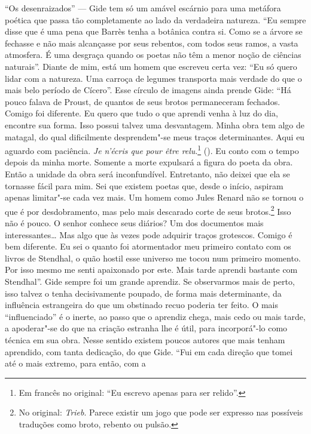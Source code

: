 ``Os desenraizados'' --- Gide tem só um amável escárnio para uma metáfora
poética que passa tão completamente ao lado da verdadeira natureza. ``Eu
sempre disse que é uma pena que Barrès tenha a botânica contra si. Como
se a árvore se fechasse e não mais alcançasse por seus rebentos, com
todos seus ramos, a vasta atmosfera. É uma desgraça quando os poetas não
têm a menor noção de ciências naturais''. Diante de mim, está um homem
que escreveu certa vez: ``Eu só quero lidar com a natureza. Uma carroça
de legumes transporta mais verdade do que o mais belo período de
Cícero''. Esse círculo de imagens ainda prende Gide: ``Há pouco falava
de Proust, de quantos de seus brotos permaneceram fechados. Comigo foi
diferente. Eu quero que tudo o que aprendi venha à luz do dia, encontre
sua forma. Isso possui talvez uma desvantagem. Minha obra tem algo de
matagal, do qual dificilmente desprendem"-se meus traços determinantes.
Aqui eu aguardo com paciência. \emph{Je n'écris que pour être
relu}.\footnote{Em francês no original: ``Eu escrevo apenas para
  ser relido''. \versal{[N. T.]}} (). Eu conto com o tempo depois da minha morte. Somente
a morte expulsará a figura do poeta da obra. Então a unidade da obra
será inconfundível. Entretanto, não deixei que ela se tornasse fácil
para mim. Sei que existem poetas que, desde o início, aspiram apenas
limitar"-se cada vez mais. Um homem como Jules Renard não se tornou o que
é por desdobramento, mas pelo mais descarado corte de seus
brotos.\footnote{No original: \emph{Trieb}. Parece existir um jogo
  que pode ser expresso nas possíveis traduções como broto, rebento ou
  pulsão. \versal{[N. T.]}} Isso não é pouco. O senhor conhece seus diários? Um dos
documentos mais interessantes\ldots{} Mas algo que às vezes pode adquirir
traços grotescos. Comigo é bem diferente. Eu sei o quanto foi
atormentador meu primeiro contato com os livros de Stendhal, o quão
hostil esse universo me tocou num primeiro momento. Por isso mesmo me
senti apaixonado por este. Mais tarde aprendi bastante com Stendhal''.
Gide sempre foi um grande aprendiz. Se observarmos mais de perto, isso
talvez o tenha decisivamente poupado, de forma mais determinante, da
influência estrangeira do que um obstinado recuo poderia ter feito. O
mais ``influenciado'' é o inerte, ao passo que o aprendiz chega, mais
cedo ou mais tarde, a apoderar"-se do que na criação estranha lhe é útil,
para incorporá"-lo como técnica em sua obra. Nesse sentido existem poucos
autores que mais tenham aprendido, com tanta dedicação, do que Gide.
``Fui em cada direção que tomei até o mais extremo, para então, com a
